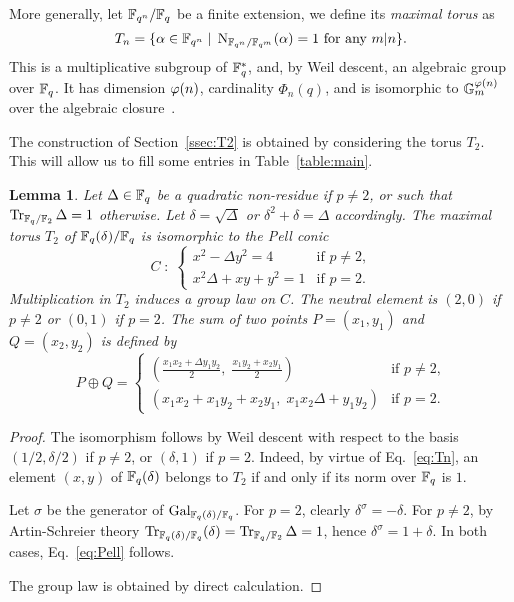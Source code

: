 \documentclass{sig-alternate}
\newtheorem{lemma}[definition]{Lemma}
\begin{document}
More generally, let $\mathbb{F}_{q^n}/\mathbb{F}_q$ be a finite extension, we define
its \emph{maximal torus} as
\begin{equation}
  \label{eq:Tn}
  T_n = \{\alpha\in\mathbb{F}_{q^n} \;|\; \operatorname{N}_{\mathbb{F}_{q^n}/\mathbb{F}_{q^m}}(\alpha) = 1 
  \text{ for any $m|n$} \}.
\end{equation}
This is a multiplicative subgroup of $\mathbb{F}_q^\ast$, and, by Weil
descent, an algebraic group over $\mathbb{F}_q$. It has dimension $\varphi(n)$,
cardinality $\Phi_n(q)$, and is isomorphic to
$\mathbb{G}_m^{\varphi(n)}$ over the algebraic
closure~\cite{rubin+silverberg03,voskresenskii98}.

The construction of Section~\ref{ssec:T2} is obtained by considering
the torus $T_2$. This will allow us to fill some entries in
Table~\ref{table:main}.

\begin{lemma}
  Let $\Delta\in\mathbb{F}_q$ be a quadratic non-residue if $p\ne2$, or such
  that $\operatorname{Tr}_{\mathbb{F}_q/\mathbb{F}_2}\Delta=1$ otherwise. Let $\delta=\sqrt{\Delta}$
  or $\delta^2+\delta=\Delta$ accordingly. The
  maximal torus $T_2$ of $\mathbb{F}_q(\delta)/\mathbb{F}_q$ is isomorphic to the
  \emph{Pell conic}
  \begin{equation}
    \label{eq:Pell}
    C \;:\; 
    \begin{cases}
      x^2 - \Delta y^2 = 4 &\text{if $p\ne2$,}\\
      x^2\Delta + xy + y^2 = 1 &\text{if $p=2$.}
    \end{cases}
  \end{equation}
  Multiplication in $T_2$ induces a group law on $C$. The neutral
  element is $(2,0)$ if $p\ne2$ or $(0,1)$ if $p=2$. The sum of two
  points $P=(x_1,y_1)$ and $Q=(x_2,y_2)$ is defined
  by
  \begin{equation*}
    P\oplus Q =
    \begin{cases}
      \displaystyle
      \left(\frac{x_1x_2 + \Delta y_1y_2}{2},\; \frac{x_1y_2 + x_2y_1}{2}\right) &
      \text{if $p\ne2$,}\\
      \left(x_1x_2 + x_1y_2 + x_2y_1,\; x_1x_2\Delta + y_1y_2\right) &
      \text{if $p=2$.}
    \end{cases}
  \end{equation*}
\end{lemma}
\begin{proof}
  The isomorphism follows by Weil descent with respect to the basis
  $(1/2,\delta/2)$ if $p\ne2$, or $(\delta,1)$ if $p=2$. Indeed, by
  virtue of Eq.~\eqref{eq:Tn}, an element $(x,y)$ of $\mathbb{F}_q(\delta)$
  belongs to $T_2$ if and only if its norm over $\mathbb{F}_q$ is $1$.

  Let $\sigma$ be the generator of $\operatorname{Gal}_{\mathbb{F}_q(\delta)/\mathbb{F}_q}$. For
  $p=2$, clearly $\delta^\sigma=-\delta$. For $p\ne2$, by
  Artin-Schreier theory
  $\operatorname{Tr}_{\mathbb{F}_q(\delta)/\mathbb{F}_q}(\delta)=\operatorname{Tr}_{\mathbb{F}_q/\mathbb{F}_2}\Delta=1$, hence
  $\delta^\sigma=1+\delta$. In both cases, Eq.~\eqref{eq:Pell}
  follows.

  The group law is obtained by direct calculation.
\end{proof}
\end{document}
